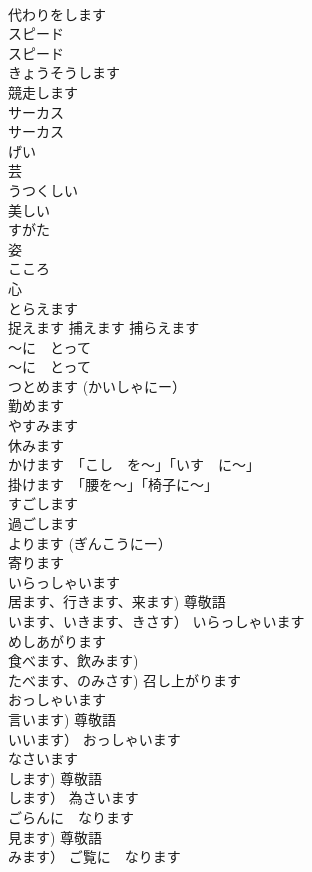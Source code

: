 \documentclass[8pt]{extreport}
\begin{document}
\begin{CJK}{UTF8}{min}
\\	代わりをします		
\\	スピード	
\\	スピード		
\\	きょうそうします	
\\	競走します		
\\	サーカス	
\\	サーカス		
\\	げい	
\\	芸		
\\	うつくしい	
\\	美しい		
\\	すがた	
\\	姿		
\\	こころ	
\\	心		
\\	とらえます	
\\	捉えます 捕えます 捕らえます		
\\	〜に　とって	
\\	〜に　とって		
\\	つとめます (かいしゃにー）	
\\	勤めます	
\\	やすみます	
\\	休みます	
\\	かけます　「こし　を〜」「いす　に〜」	
\\	掛けます　「腰を〜」「椅子に〜」		
\\	すごします	
\\	過ごします	
\\	よります (ぎんこうにー）	
\\	寄ります	
\\	いらっしゃいます	
\\	居ます、行きます、来ます) 尊敬語 
\\	います、いきます、きさす）	いらっしゃいます	
\\	めしあがります	
\\	食べます、飲みます) 
\\	たべます、のみさす)	召し上がります	
\\	おっしゃいます	
\\	言います) 尊敬語 
\\	いいます）	おっしゃいます	
\\	なさいます	
\\	します) 尊敬語 
\\	します）	為さいます	
\\	ごらんに　なります	
\\	見ます) 尊敬語 
\\	みます）	ご覧に　なります	

\end{CJK}
\end{document}
